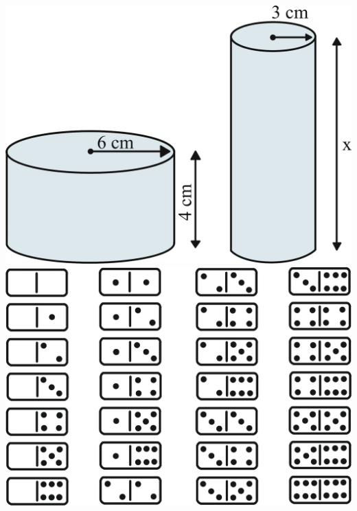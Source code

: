 




\includegraphics[width=\textwidth]{./ilustras-mat/Simulado_4-atividade_12.png}
\includegraphics[width=\textwidth]{./ilustras-mat/Simulado_4-atividade_15.png}

